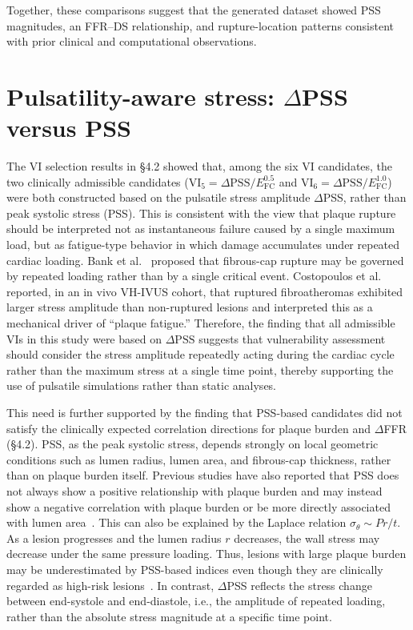\documentclass[master,english,final]{kaist-ucs}
\begin{document}
Together, these comparisons suggest that the generated dataset showed PSS magnitudes, an FFR--DS relationship, and rupture-location patterns consistent with prior clinical and computational observations.

\section{Pulsatility-aware stress: $\Delta$PSS versus PSS}
The VI selection results in \S4.2 showed that, among the six VI candidates, the two clinically admissible candidates ($\mathrm{VI}_5 = \Delta\mathrm{PSS}/E_\mathrm{FC}^{0.5}$ and $\mathrm{VI}_6 = \Delta\mathrm{PSS}/E_\mathrm{FC}^{1.0}$) were both constructed based on the pulsatile stress amplitude $\Delta$PSS, rather than peak systolic stress (PSS). This is consistent with the view that plaque rupture should be interpreted not as instantaneous failure caused by a single maximum load, but as fatigue-type behavior in which damage accumulates under repeated cardiac loading. Bank et al.~\cite{bank2000} proposed that fibrous-cap rupture may be governed by repeated loading rather than by a single critical event. Costopoulos et al.~\cite{costopoulos2017} reported, in an in vivo VH-IVUS cohort, that ruptured fibroatheromas exhibited larger stress amplitude than non-ruptured lesions and interpreted this as a mechanical driver of ``plaque fatigue.'' Therefore, the finding that all admissible VIs in this study were based on $\Delta\mathrm{PSS}$ suggests that vulnerability assessment should consider the stress amplitude repeatedly acting during the cardiac cycle rather than the maximum stress at a single time point, thereby supporting the use of pulsatile simulations rather than static analyses.

This need is further supported by the finding that PSS-based candidates did not satisfy the clinically expected correlation directions for plaque burden and $\Delta$FFR (\S4.2). PSS, as the peak systolic stress, depends strongly on local geometric conditions such as lumen radius, lumen area, and fibrous-cap thickness, rather than on plaque burden itself. Previous studies have also reported that PSS does not always show a positive relationship with plaque burden and may instead show a negative correlation with plaque burden or be more directly associated with lumen area~\cite{costopoulos2017, teng2014}. This can also be explained by the Laplace relation $\sigma_\theta \sim P r/t$. As a lesion progresses and the lumen radius $r$ decreases, the wall stress may decrease under the same pressure loading. Thus, lesions with large plaque burden may be underestimated by PSS-based indices even though they are clinically regarded as high-risk lesions~\cite{teng2014}. In contrast, $\Delta$PSS reflects the stress change between end-systole and end-diastole, i.e., the amplitude of repeated loading, rather than the absolute stress magnitude at a specific time point.
\end{document}
